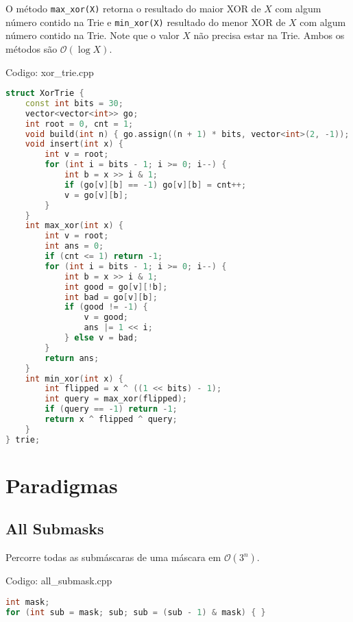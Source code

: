 \documentclass[10pt, a4paper, oneside]{book}
\begin{document}
O método \texttt{max\_xor(X)} retorna o resultado do maior XOR de $X$ com algum número contido na Trie e \texttt{min\_xor(X)} resultado do menor XOR de $X$ com algum número contido na Trie. Note que o valor $X$ não precisa estar na Trie. Ambos os métodos são $\mathcal{O}(\log X)$.

\hfill

Codigo: xor\_trie.cpp

\begin{lstlisting}[language=C++]
struct XorTrie {
    const int bits = 30;
    vector<vector<int>> go;
    int root = 0, cnt = 1;
    void build(int n) { go.assign((n + 1) * bits, vector<int>(2, -1)); }
    void insert(int x) {
        int v = root;
        for (int i = bits - 1; i >= 0; i--) {
            int b = x >> i & 1;
            if (go[v][b] == -1) go[v][b] = cnt++;
            v = go[v][b];
        }
    }
    int max_xor(int x) {
        int v = root;
        int ans = 0;
        if (cnt <= 1) return -1;
        for (int i = bits - 1; i >= 0; i--) {
            int b = x >> i & 1;
            int good = go[v][!b];
            int bad = go[v][b];
            if (good != -1) {
                v = good;
                ans |= 1 << i;
            } else v = bad;
        }
        return ans;
    }
    int min_xor(int x) {
        int flipped = x ^ ((1 << bits) - 1);
        int query = max_xor(flipped);
        if (query == -1) return -1;
        return x ^ flipped ^ query;
    }
} trie;
\end{lstlisting}
\hfill

\newpage

%
%
%
%

\chapter{Paradigmas}

\section{All Submasks}


Percorre todas as submáscaras de uma máscara em $\mathcal{O}(3^n)$.

\hfill

Codigo: all\_submask.cpp

\begin{lstlisting}[language=C++]
int mask;
for (int sub = mask; sub; sub = (sub - 1) & mask) { }
\end{lstlisting}
\hfill
\end{document}
